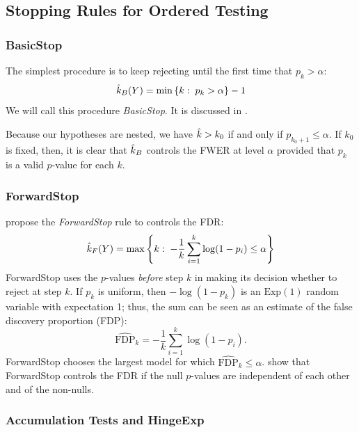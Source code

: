 \documentclass{article}
\begin{document}
\subsection{Stopping Rules for Ordered Testing}
\label{sec:orderedProposals}

\subsubsection{BasicStop}
The simplest procedure is to keep rejecting until the first time that $p_k > \alpha$: 
\[
\hat{k}_B(Y) = \min\left\{k:\; p_k > \alpha\right\} - 1
\]
We will call this procedure {\em BasicStop}. It is discussed in \citet{marcus1976}.

Because our hypotheses are nested, we have $\hat{k} > k_0$ if and only if $p_{k_0+1} \leq \alpha$. If $k_0$ is fixed, then, it is clear that $\hat{k}_B$ controls the FWER at level $\alpha$ provided that $p_k$ is a valid $p$-value for each $k$. 

\subsubsection{ForwardStop}

\citet{gsell2013sequential} propose the {\em ForwardStop} rule to controls the FDR:
\[
  \hat{k}_{F}(Y) = \max\left\{k:\;
    -\frac{1}{k}\sum_{i=1}^k \log(1-p_i) \leq \alpha\right\}
\]
ForwardStop uses the $p$-values {\it before} step $k$ in making its decision whether to reject at step $k$. If $p_k$ is uniform, then $-\log(1-p_k)$ is an $\text{Exp}(1)$ random variable with expectation 1; thus, the sum can be seen as an estimate of the false discovery proportion (FDP):
\[
\widehat{\text{FDP}}_k = -\frac{1}{k}\sum_{i=1}^k \log(1-p_i).
\]
ForwardStop chooses the largest model for which $\widehat{\text{FDP}}_k \leq \alpha$. \citet{gsell2013sequential} show that ForwardStop controls the FDR if the null $p$-values are independent of each other and of the non-nulls.

\subsubsection{Accumulation Tests and HingeExp}
\end{document}

